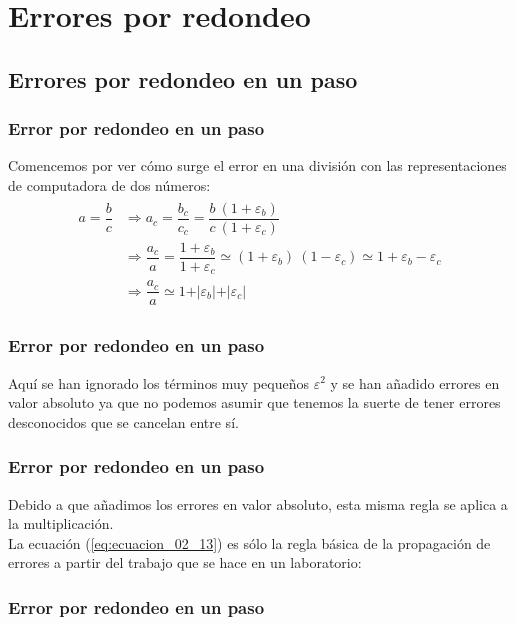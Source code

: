 \section{Errores por redondeo}
\subsection{Errores por redondeo en un paso}
\begin{frame}
\frametitle{Error por redondeo en un paso}
Comencemos por ver cómo surge el error en una división con las representaciones de computadora de dos números:
\begin{align}
\begin{aligned}
a = \dfrac{b}{c} &\Rightarrow a_{c} = \dfrac{b_{c}}{c_{c}} = \dfrac{b \ (1 + \varepsilon_{b})}{c \: (1 + \varepsilon_{c})} \\
&\Rightarrow \dfrac{a_{c}}{a} = \dfrac{1 + \varepsilon_{b}}{1 + \varepsilon_{c}} \simeq (1 + \varepsilon_{b}) \: (1 - \varepsilon_{c}) \simeq 1 + \varepsilon_{b} - \varepsilon_{c} \\
&\Rightarrow \dfrac{a_{c}}{a} \simeq 1 + \vert \varepsilon_{b} \vert + \vert \varepsilon_{c} \vert
\label{eq:ecuacion_02_13}
\end{aligned}
\end{align}
\end{frame}
\begin{frame}
\frametitle{Error por redondeo en un paso}
Aquí se han ignorado los términos muy pequeños $\varepsilon^{2}$ y se han añadido errores en valor absoluto ya que no podemos asumir que tenemos la suerte de tener errores desconocidos que se cancelan entre sí.
\end{frame}
\begin{frame}
\frametitle{Error por redondeo en un paso}
Debido a que añadimos los errores en valor absoluto, esta misma regla se aplica a la multiplicación.
\\
\bigskip
La ecuación (\ref{eq:ecuacion_02_13}) es sólo la regla básica de la propagación de errores a partir del trabajo que se hace en un laboratorio:
\end{frame}
\begin{frame}
\frametitle{Error por redondeo en un paso}
\end{frame}
